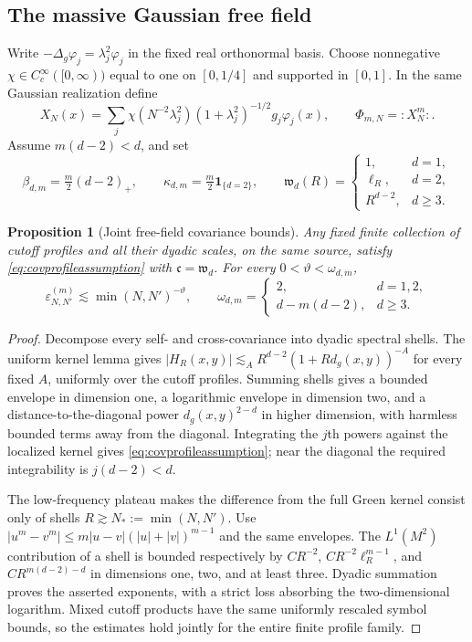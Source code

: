 \documentclass[11pt,a4paper]{amsart}
\numberwithin{equation}{section}
\newtheorem{proposition}[theorem]{Proposition}
\theoremstyle{definition}
\theoremstyle{remark}
\newcommand{\R}{\mathbb R}
\begin{document}
\subsection{The massive Gaussian free field}
Write $-\Delta_g\varphi_j=\lambda_j^2\varphi_j$ in the fixed real orthonormal basis. Choose nonnegative $\chi\in C_c^\infty([0,\infty))$ equal to one on $[0,1/4]$ and supported in $[0,1]$. In the same Gaussian realization define
\begin{equation}\label{eq:gff}
 X_N(x)=\sum_j\chi(N^{-2}\lambda_j^2)(1+\lambda_j^2)^{-1/2}g_j\varphi_j(x),
 \qquad \Phi_{m,N}={:X_N^m:}.
\end{equation}
Assume $m(d-2)<d$, and set
\[
 \beta_{d,m}=\tfrac m2(d-2)_+,\qquad
 \kappa_{d,m}=\tfrac m2\mathbf1_{\{d=2\}},\qquad
 \mathfrak w_d(R)=
 \begin{cases}1,&d=1,\\\ell_R,&d=2,\\R^{d-2},&d\ge3.\end{cases}
\]
\begin{proposition}[Joint free-field covariance bounds]\label{prop:gffcertificate}
Any fixed finite collection of cutoff profiles and all their dyadic scales, on the same source, satisfy \eqref{eq:covprofileassumption} with $\mathfrak c=\mathfrak w_d$. For every $0<\vartheta<\omega_{d,m}$,
\[
 \varepsilon_{N,N'}^{(m)}\lesssim\min(N,N')^{-\vartheta},\qquad
 \omega_{d,m}=
 \begin{cases}2,&d=1,2,\\d-m(d-2),&d\ge3.\end{cases}
\]
\end{proposition}
\begin{proof}
Decompose every self- and cross-covariance into dyadic spectral shells. The uniform kernel lemma gives
$|H_R(x,y)|\lesssim_A R^{d-2}(1+Rd_g(x,y))^{-A}$
for every fixed $A$, uniformly over the cutoff profiles. Summing shells gives a bounded envelope in dimension one, a logarithmic envelope in dimension two, and a distance-to-the-diagonal power $d_g(x,y)^{2-d}$ in higher dimension, with harmless bounded terms away from the diagonal. Integrating the $j$th powers against the localized kernel gives \eqref{eq:covprofileassumption}; near the diagonal the required integrability is $j(d-2)<d$.

The low-frequency plateau makes the difference from the full Green kernel consist only of shells $R\gtrsim N_*:=\min(N,N')$. Use
$|u^m-v^m|\le m|u-v|(|u|+|v|)^{m-1}$
and the same envelopes. The $L^1(M^2)$ contribution of a shell is bounded respectively by
$CR^{-2}$, $CR^{-2}\ell_R^{m-1}$, and $CR^{m(d-2)-d}$
in dimensions one, two, and at least three. Dyadic summation proves the asserted exponents, with a strict loss absorbing the two-dimensional logarithm. Mixed cutoff products have the same uniformly rescaled symbol bounds, so the estimates hold jointly for the entire finite profile family.
\end{proof}
\end{document}
